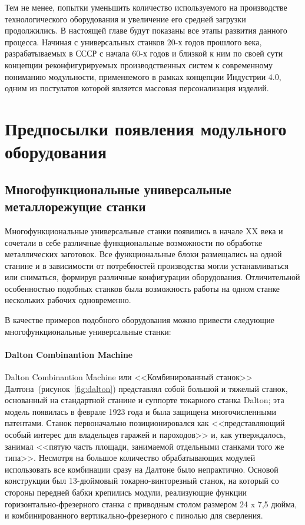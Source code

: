Тем не менее, попытки уменьшить количество используемого на производстве технологического оборудования и увеличение его средней загрузки продолжились. В настоящей главе будут показаны все этапы развития данного процесса. Начиная с универсальных станков 20-х годов прошлого века, разрабатываемых в СССР с начала 60-х годов и близкой к ним по своей сути концепции реконфигурируемых производственных систем к современному пониманию модульности, применяемого в рамках концепции Индустрии 4.0, одним из постулатов которой является массовая персонализация изделий.

\section{Предпосылки появления модульного оборудования}

\subsection{Многофункциональные универсальные металлорежущие станки}

Многофункциональные универсальные станки появились в начале XX века и сочетали в себе различные функциональные возможности по обработке металлических заготовок. Все функциональные блоки размещались на одной станине и в зависимости от потребностей производства могли устанавливаться или сниматься, формируя различные конфигурации оборудования. Отличительной особенностью подобных станков была возможность работы на одном станке нескольких рабочих одновременно.

В качестве примеров подобного оборудования можно привести следующие многофункциональные универсальные станки:

\paragraph{Dalton Combinantion Machine}

Dalton Combinantion Machine или <<Комбинированный станок>> Далтона~(рисунок~\cref{fig:dalton}) представлял собой большой и тяжелый станок, основанный на стандартной станине и суппорте токарного станка Dalton; эта модель появилась в феврале 1923 года и была защищена многочисленными патентами. Станок первоначально позиционировался как <<представляющий особый интерес для владельцев гаражей и пароходов>> и, как утверждалось, занимал <<пятую часть площади, занимаемой отдельными станками того же типа>>. Несмотря на большое количество обрабатывающих модулей использовать все комбинации сразу на Далтоне было непрактично. Основой конструкции был 13-дюймовый токарно-винторезный станок, на который со стороны передней бабки крепились модули, реализующие функции горизонтально-фрезерного станка с приводным столом размером 24 x 7,5 дюйма, и комбинированного вертикально-фрезерного с пинолью для сверления. 

